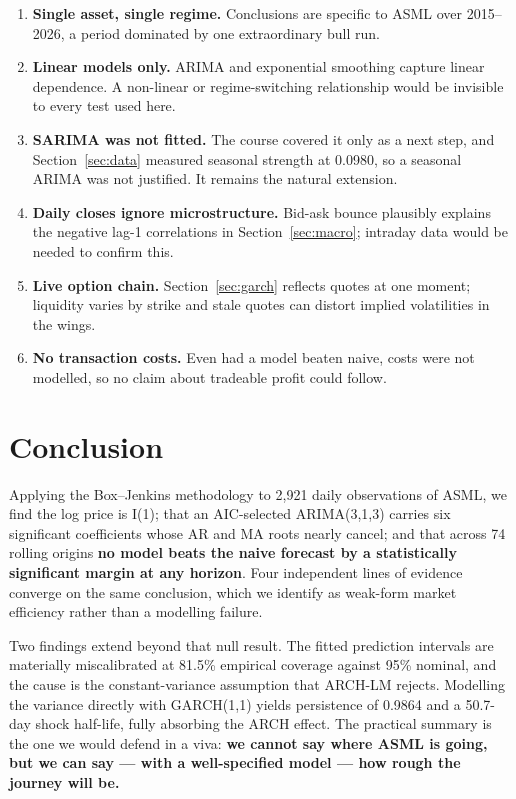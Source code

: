 \documentclass[12pt,a4paper]{article}
\begin{document}
\begin{enumerate}
\item \textbf{Single asset, single regime.} Conclusions are specific to ASML over
2015--2026, a period dominated by one extraordinary bull run.
\item \textbf{Linear models only.} ARIMA and exponential smoothing capture linear
dependence. A non-linear or regime-switching relationship would be invisible to
every test used here.
\item \textbf{SARIMA was not fitted.} The course covered it only as a next step,
and Section~\ref{sec:data} measured seasonal strength at 0.0980, so a seasonal
ARIMA was not justified. It remains the natural extension.
\item \textbf{Daily closes ignore microstructure.} Bid-ask bounce plausibly
explains the negative lag-1 correlations in Section~\ref{sec:macro}; intraday
data would be needed to confirm this.
\item \textbf{Live option chain.} Section~\ref{sec:garch} reflects quotes at one
moment; liquidity varies by strike and stale quotes can distort implied
volatilities in the wings.
\item \textbf{No transaction costs.} Even had a model beaten naive, costs were
not modelled, so no claim about tradeable profit could follow.
\end{enumerate}

\section{Conclusion}
\label{sec:conclusion}

Applying the Box--Jenkins methodology \cite{boxjenkins1970} to 2,921 daily
observations of ASML, we find the log price is I(1); that an AIC-selected
ARIMA(3,1,3) carries six significant coefficients whose AR and MA roots nearly
cancel; and that across 74 rolling origins \textbf{no model beats the naive
forecast by a statistically significant margin at any horizon}. Four independent
lines of evidence converge on the same conclusion, which we identify as weak-form
market efficiency rather than a modelling failure.

Two findings extend beyond that null result. The fitted prediction intervals are
materially miscalibrated at 81.5\% empirical coverage against 95\% nominal, and
the cause is the constant-variance assumption that ARCH-LM rejects. Modelling the
variance directly with GARCH(1,1) yields persistence of 0.9864 and a 50.7-day
shock half-life, fully absorbing the ARCH effect. The practical summary is the one
we would defend in a viva: \textbf{we cannot say where ASML is going, but we can
say --- with a well-specified model --- how rough the journey will be.}
\end{document}
